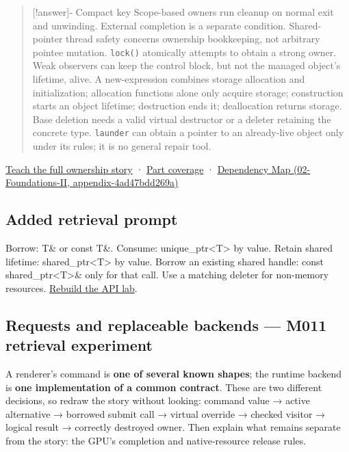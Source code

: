 \begin{quote}
{[}!answer{]}- Compact key Scope-based owners run cleanup on normal exit and unwinding. External completion is a separate condition. Shared-pointer thread safety concerns ownership bookkeeping, not arbitrary pointee mutation. \texttt{lock()} atomically attempts to obtain a strong owner. Weak observers can keep the control block, but not the managed object's lifetime, alive. A new-expression combines storage allocation and initialization; allocation functions alone only acquire storage; construction starts an object lifetime; destruction ends it; deallocation returns storage. Base deletion needs a valid virtual destructor or a deleter retaining the concrete type. \texttt{launder} can obtain a pointer to an already-live object only under its rules; it is no general repair tool.
\end{quote}

\href{Continuous\%20Notes/Computing\%20Foundations\%20-\%20From\%20Bits\%20to\%20C++\%20and\%20Systems\%20APIs\#From\%20a\%20live\%20object\%20to\%20responsible\%20resource\%20ownership}{Teach the full ownership story} · \hyperref[appendix-fd090d982a15]{Part coverage} · \href{}{Dependency Map (02-Foundations-II, appendix-4ad47bdd269a)}

\subsection{Added retrieval prompt}\label{added-retrieval-prompt}

Borrow: T\& or const T\&. Consume: unique\_ptr\textless T\textgreater{} by value. Retain shared lifetime: shared\_ptr\textless T\textgreater{} by value. Borrow an existing shared handle: const shared\_ptr\textless T\textgreater{}\& only for that call. Use a matching deleter for non-memory resources. \href{Continuous\%20Notes/Computing\%20Foundations\%20-\%20From\%20Bits\%20to\%20C++\%20and\%20Systems\%20APIs\#Worked\%20API\%20choice:\%20borrow,\%20consume,\%20retain,\%20or\%20copy\%20a\%20value}{Rebuild the API lab}.

\subsection{Requests and replaceable backends --- M011 retrieval experiment}\label{requests-and-replaceable-backends-m011-retrieval-experiment}

A renderer's command is \textbf{one of several known shapes}; the runtime backend is \textbf{one implementation of a common contract}. These are two different decisions, so redraw the story without looking: command value → active alternative → borrowed submit call → virtual override → checked visitor → logical result → correctly destroyed owner. Then explain what remains separate from the story: the GPU's completion and native-resource release rules.

